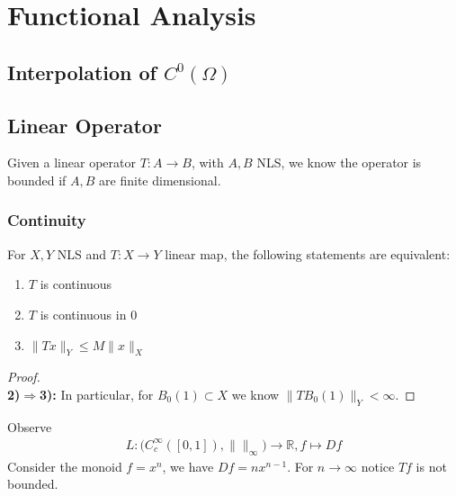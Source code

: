 \chapter{Functional Analysis}
\section{Interpolation of \texorpdfstring{$C^0(\Omega)$}{C\textasciicircum{}0(Omega)}}

\begin{example}
\end{example}

\begin{example}
\end{example}


\section{Linear Operator}
Given a linear operator $T: A \rightarrow B$, with $A, B$ NLS, we know the operator is bounded if $A, B$ are finite dimensional. 
\subsection{Continuity}
\begin{theorem}
For $X, Y$ NLS and $T:X \rightarrow Y$ linear map, the following statements are equivalent:
\begin{enumerate}
	\item $T$ is continuous
	\item $T$ is continuous in $0$
	\item $\|Tx\|_Y \le M \|x\|_X$
\end{enumerate}
\end{theorem}
\begin{proof}
\quad\\
\textbf{2)$\Rightarrow$3):} In particular, for $B_0(1) \subset X$ we know $\|T B_0(1)\|_Y < \infty$. 
\end{proof}
\begin{example}
	Observe
	\begin{align*}
		L: \bigg(C_c^\infty([0, 1]), \|\|_\infty \bigg) \rightarrow \mathbb{R}, f \mapsto Df
	\end{align*}
	Consider the monoid $f = x^n$, we have $Df = n x^{n -1}$. For $n \rightarrow \infty$ notice $Tf$ is not bounded. 
\end{example}

